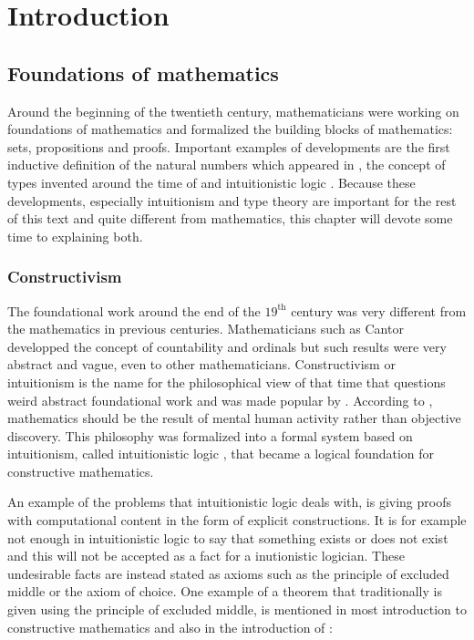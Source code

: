 \documentclass[12pt,a4paper,twoside,xetex]{book}
\begin{document}
\chapter{Introduction}

\section{Foundations of mathematics}\label{types}

Around the beginning of the twentieth century, mathematicians were working on foundations of mathematics and formalized the building blocks of mathematics: sets, propositions and proofs. Important examples of developments are the first inductive definition of the natural numbers which appeared in \cite{Peano1879}, the concept of types invented around the time of \cite{Russel1903} and intuitionistic logic \cite{Heyting1930}. Because these developments, especially intuitionism and type theory are important for the rest of this text and quite different from mathematics, this chapter will devote some time to explaining both.

\subsection{Constructivism}\label{constructivism}

The foundational work around the end of the $19^{\text{th}}$ century was very 
different from the mathematics in previous centuries. Mathematicians such as 
Cantor developped the concept of countability and ordinals but such results 
were very abstract and vague, even to other mathematicians. Constructivism 
or intuitionism is the name for the philosophical view of that time that 
questions weird abstract foundational work and was made popular by 
\cite{Brouwer1905}. According to \cite{Brouwer1905}, mathematics should be the 
result of mental human activity rather than objective discovery. This philosophy 
was formalized into a formal system based on intuitionism, called intuitionistic 
logic \cite{Heyting1930}, that became a logical foundation for constructive 
mathematics. 

An example of the problems that intuitionistic logic deals with, is giving 
proofs with computational content in the form of explicit constructions. It is 
for example not enough in intuitionistic logic to say that something exists or 
does not exist and this will not be accepted as a fact for a inutionistic 
logician. These undesirable facts are instead stated as axioms such as the 
principle of excluded middle or the axiom of choice. One example of a theorem 
that traditionally is given using the principle of excluded middle, is mentioned 
in most introduction to constructive mathematics and also in the introduction of 
\cite{Palmgren2014}:
\end{document}
